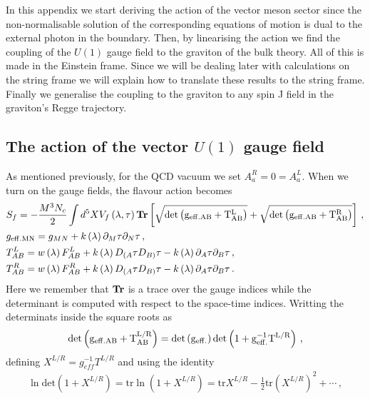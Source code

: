 \documentclass[a4paper,12pt]{article}
\begin{document}
In this appendix we start deriving the action of the vector meson sector since the non-normalisable solution of the corresponding equations of motion is dual to the external photon in the boundary. Then, by linearising the action we find the coupling of the $U(1)$ gauge field to the graviton of the bulk theory. All of this is made in the Einstein frame. Since we will be dealing later with calculations on the string frame we will explain how to translate these results to the string frame. Finally we generalise the coupling to the graviton to any spin J field in the graviton's Regge trajectory.

\subsection*{The action of the vector $U(1)$ gauge field}
As mentioned previously, for the QCD vacuum we set $A^R_a = 0 = A^L_a$.
When we turn on the gauge fields, the flavour action becomes
\begin{align}
&S_f = - \frac{M^3 N_c}{2}  \int d^5 X V_f \left( \lambda, \tau \right) \bold{Tr} \left[ \sqrt{\rm{det} \left(g_{\rm{eff.} AB} + T^{L}_{AB}\right)} + \sqrt{\rm{det} \left(g_{\rm{eff.} AB} + T^{R}_{AB}\right)} \right] \, , \\
&g_{\rm{eff.} MN} = g_{MN} +  k\left(\lambda\right) \partial_M \tau \partial_N \tau \, , \\
&T^{L}_{AB} = w\left(\lambda\right) F^{L}_{AB} + k\left(\lambda\right)D_{(A}\tau D_{B)}\tau -   k\left(\lambda\right) \partial_A \tau \partial_B \tau \, , \\
&T^{R}_{AB} = w\left(\lambda\right) F^{R}_{AB} + k\left(\lambda\right)D_{(A}\tau D_{B)}\tau - k\left(\lambda\right) \partial_A \tau \partial_B \tau \, .
\end{align}
Here we remember that $\bold{Tr}$ is a trace over the gauge indices while the determinant is computed with respect to the space-time indices. Writting the determinats inside the square roots as 
\begin{align}
\rm{det}\left(g_{\rm{eff.} AB} + T^{L/R}_{AB} \right) = \rm{det} \left(g_{\rm{eff.}} \right)  \rm{det} \left( 1 + g_{\rm{eff.}}^{-1} T^{L/R} \right) \, ,
\end{align}
defining $X^{L/R} = g_{eff}^{-1} T^{L/R}$ and using the identity
\begin{align}
\ln \text{det} \left(1+X^{L/R}\right) = \text{tr} \ln\left(1 + X^{L/R}\right) = \text{tr} X^{L/R} - \frac{1}{2} \text{tr} {\left(X^{L/R}\right)}^2 + \cdots \, ,
\end{align}
\end{document}
